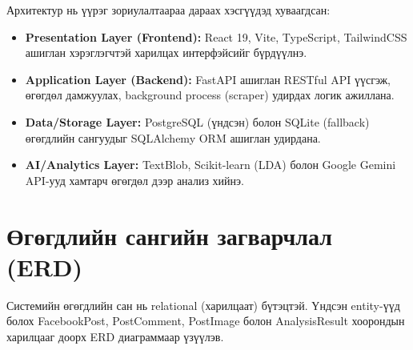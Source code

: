 Архитектур нь үүрэг зориулалтаараа дараах хэсгүүдэд хуваагдсан:
\begin{itemize}
    \item \textbf{Presentation Layer (Frontend):} React 19, Vite, TypeScript, TailwindCSS ашиглан хэрэглэгчтэй харилцах интерфэйсийг бүрдүүлнэ.
    \item \textbf{Application Layer (Backend):} FastAPI ашиглан RESTful API үүсгэж, өгөгдөл дамжуулах, background process (scraper) удирдах логик ажиллана.
    \item \textbf{Data/Storage Layer:} PostgreSQL (үндсэн) болон SQLite (fallback) өгөгдлийн сангуудыг SQLAlchemy ORM ашиглан удирдана.
    \item \textbf{AI/Analytics Layer:} TextBlob, Scikit-learn (LDA) болон Google Gemini API-ууд хамтарч өгөгдөл дээр анализ хийнэ.
\end{itemize}

\section{Өгөгдлийн сангийн загварчлал (ERD)}

Системийн өгөгдлийн сан нь relational (харилцаат) бүтэцтэй. Үндсэн entity-үүд болох FacebookPost, PostComment, PostImage болон AnalysisResult хоорондын харилцааг доорх ERD диаграммаар үзүүлэв.

